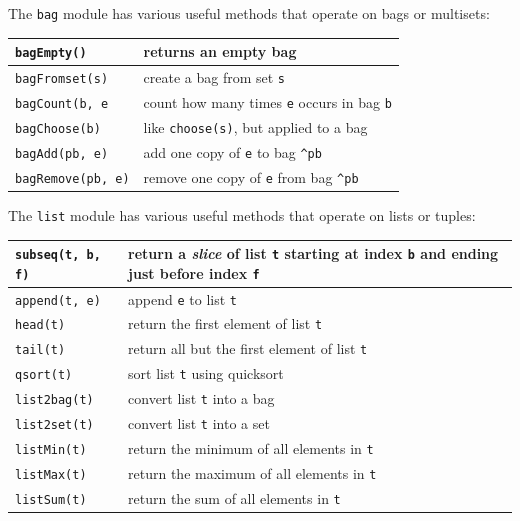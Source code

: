 \documentclass{report}
\begin{document}
The \texttt{bag} module
has various useful methods that operate on bags or
multisets:

\vspace{1em}
\begin{tabular}{|l|l|}
\hline
\texttt{bagEmpty()} & returns an empty bag\\
\hline
\texttt{bagFromset(s)} & create a bag from set \texttt{s}\\
\hline
\texttt{bagCount(b, e} & count how many times \texttt{e} occurs in bag \texttt{b}\\
\hline
\texttt{bagChoose(b)} & like \texttt{choose(s)}, but applied to a bag\\
\hline
\texttt{bagAdd(pb, e)} & add one copy of \texttt{e} to bag \texttt{\^{}pb}\\
\hline
\texttt{bagRemove(pb, e)} & remove one copy of \texttt{e} from bag \texttt{\^{}pb}\\
\hline
\end{tabular}
\vspace{1em}

\noindent
{}
The \texttt{list} module has various useful methods that operate on lists
or tuples:

\vspace{1em}
\begin{tabular}{|l|l|}
\hline
\texttt{subseq(t, b, f)} & return a \emph{slice} of list \texttt{t} starting
at index \texttt{b} and ending just before index \texttt{f}\\
\hline
\texttt{append(t, e)} & append \texttt{e} to list \texttt{t}\\
\hline
\texttt{head(t)} & return the first element of list \texttt{t}\\
\hline
\texttt{tail(t)} & return all but the first element of list \texttt{t}\\
\hline
\texttt{qsort(t)} & sort list \texttt{t} using quicksort\\
\hline
\texttt{list2bag(t)} & convert list \texttt{t} into a bag \\
\hline
\texttt{list2set(t)} & convert list \texttt{t} into a set \\
\hline
\texttt{listMin(t)} & return the minimum of all elements in \texttt{t}\\
\hline
\texttt{listMax(t)} & return the maximum of all elements in \texttt{t}\\
\hline
\texttt{listSum(t)} & return the sum of all elements in \texttt{t}\\
\hline
\end{tabular}
\end{document}
